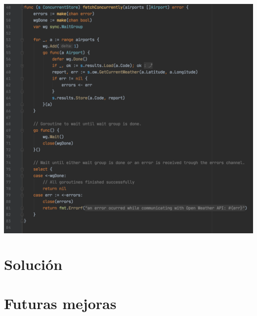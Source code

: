 \documentclass[10pt, letterpaper]{article}
\begin{document}
\begin{center}
  \includegraphics[scale=.4]{concurrency.png}
\end{center}

\section{Solución}
\section{Futuras mejoras}
\end{document}
